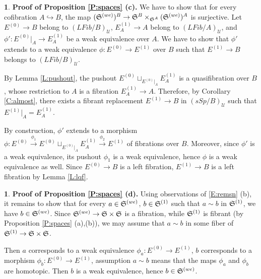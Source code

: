 \documentclass[12pt]{amsart}
\theoremstyle{plain}
\theoremstyle{definition}
\newtheorem{Emp}[Thm]{}
\numberwithin{equation}{section}
\newcommand{\cal}[1]{\mathcal{#1}}
\newcommand{\C}[1]{\cal#1}
\newcommand{\lra}{\longrightarrow}
\newcommand{\hra}{\hookrightarrow}
\newcommand{\rl}[1]{Lemma \ref{L:#1}}
\newcommand{\rp}[1]{Proposition \ref{P:#1}}
\newcommand{\re}[1]{\ref{E:#1}}
\newcommand{\rco}[1]{Corollary \ref{C:#1}}
\renewcommand{\S}{\frak{S}}
\begin{document}
\begin{Emp} \label{E:pfspacesc}
{\bf Proof of \rp{spaces} (c).} We have to show that for every cofibration $A\hra B$, the map 
$(\S^{(we)})^B\to \S^B\times_{\S^A}(\S^{(we)})^A$ is
surjective. Let $E^{(0)}\to B$ belong to $(LFib/B)_{\C{U}}$, $E_A^{(1)}\to A$
belong to $(LFib/A)_{\C{U}}$, and $\phi':E^{(0)}|_A\to E_A^{(1)}$ be 
a weak equivalence over $A$. We have to show that $\phi'$
extends to a weak equivalence $\phi:E^{(0)}\to E^{(1)}$ over $B$
such that $E^{(1)}\to B$ belongs to $(LFib/B)_{\C{U}}$.

By \rl{pushout}, the pushout $E^{(0)}\sqcup_{E^{(0)}|_A} E_A^{(1)}$
is a quasifibration over $B$, whose restriction to $A$ is a
fibration $E_A^{(1)}\to A$. Therefore, by \rco{almost}, there
exists a fibrant replacement $E^{(1)}\to B$ in $(sSp/B)_{\C{U}}$
such that $E^{(1)}|_A=E_A^{(1)}$.

By construction, $\phi'$ extends to a morphism
$\phi:E^{(0)}\overset{\phi_1}{\lra} E^{(0)}\sqcup_{E^{(0)}|_A}
E_A^{(1)}\overset{\phi_2}{\lra} E^{(1)}$ of fibrations over $B$.
Moreover, since $\phi'$ is a weak equivalence, its pushout
$\phi_1$ is a weak equivalence, hence $\phi$ is a weak equivalence
as well. Since $E^{(0)}\to B$ is a left fibration, $E^{(1)}\to B$ is a left
fibration by \rl{lqf}.
\end{Emp}

\begin{Emp} \label{E:pfspacesd}
{\bf Proof of \rp{spaces} (d).} Using observations of \re{remsn}
(b), it remains to show that for every $a\in\S^{(we)}$,
$b\in\S^{(1)}$ such that $a\sim b$ in $\S^{(1)}$, we have $b\in
\S^{(we)}$. Since $\S^{(we)}\to \S\times \S$ is a fibration, while
$\S^{(1)}$ is fibrant (by \rp{spaces} (a),(b)), we may assume that
$a\sim b$ in some fiber of $\S^{(1)}\to\S\times\S$.

Then $a$ corresponds to a weak equivalence $\phi_a:E^{(0)}\to
E^{(1)}$, $b$ corresponds to a morphism $\phi_b:E^{(0)}\to
E^{(1)}$, assumption $a\sim b$ means that the maps $\phi_a$ and
$\phi_b$ are homotopic. Then $b$ is a weak equivalence, hence
$b\in\S^{(we)}$.
\end{Emp}
\end{document}
